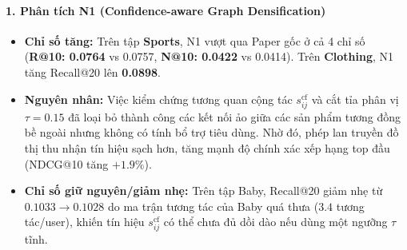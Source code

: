 \paragraph{1. Phân tích N1 (Confidence-aware Graph Densification)}
\begin{itemize}[leftmargin=*]
  \item \textbf{Chỉ số tăng:} Trên tập \textbf{Sports}, N1 vượt qua Paper gốc ở cả 4 chỉ số (\textbf{R@10: 0.0764} vs 0.0757, \textbf{N@10: 0.0422} vs 0.0414). Trên \textbf{Clothing}, N1 tăng Recall@20 lên \textbf{0.0898}.
  \item \textbf{Nguyên nhân:} Việc kiểm chứng tương quan cộng tác $s_{ij}^{\text{cf}}$ và cắt tỉa phân vị $\tau = 0.15$ đã loại bỏ thành công các kết nối ảo giữa các sản phẩm tương đồng bề ngoài nhưng không có tính bổ trợ tiêu dùng. Nhờ đó, phép lan truyền đồ thị thu nhận tín hiệu sạch hơn, tăng mạnh độ chính xác xếp hạng top đầu (NDCG@10 tăng $+1.9\%$).
  \item \textbf{Chỉ số giữ nguyên/giảm nhẹ:} Trên tập Baby, Recall@20 giảm nhẹ từ $0.1033 \to 0.1028$ do ma trận tương tác của Baby quá thưa ($3.4$ tương tác/user), khiến tín hiệu $s_{ij}^{\text{cf}}$ có thể chưa đủ dồi dào nếu dùng một ngưỡng $\tau$ tĩnh.
\end{itemize}

